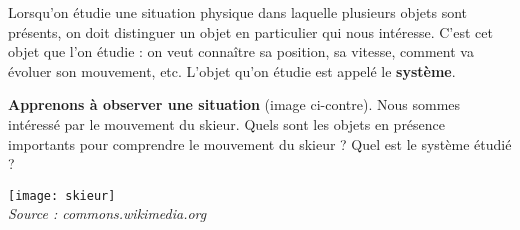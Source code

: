








\begin{activite}

Lorsqu'on étudie une situation physique dans laquelle plusieurs objets sont présents, on doit distinguer un objet en particulier qui nous intéresse. C'est cet objet que l'on étudie : on veut connaître sa position, sa vitesse, comment va évoluer son mouvement, etc. L'objet qu'on étudie est appelé le \textbf{système}.


\begin{minipage}{.48\linewidth}
\textbf{Apprenons à observer une situation} (image ci-contre). Nous sommes intéressé par le mouvement du skieur. Quels sont les objets en présence importants pour comprendre le mouvement du skieur ? Quel est le système étudié ?
\end{minipage}%
\hfill
\begin{minipage}{.48\linewidth}
\centering
\texttt{[image: skieur]} \\
{\scriptsize \textsl{Source : commons.wikimedia.org}} %
\end{minipage}

\end{activite}










